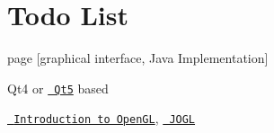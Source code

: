 \chapter{Todo List}
\hypertarget{todo}{}\label{todo}

\begin{DoxyRefList}
\item[page \doxylink{index}{Quadrics rendering} ]\label{todo__todo000001}%
%
\mbox{[}graphical interface, Java Implementation\mbox{]} 



Qt4 or \href{https://www.qt.io}{\texttt{ Qt5}} based 



\href{http://www.cs.cornell.edu/courses/cs4620/2011fa/lectures/practicum01.pdf}{\texttt{ Introduction to Open\+GL}}, \href{http://jogamp.org/jogl/www/}{\texttt{ JOGL}}
\end{DoxyRefList}